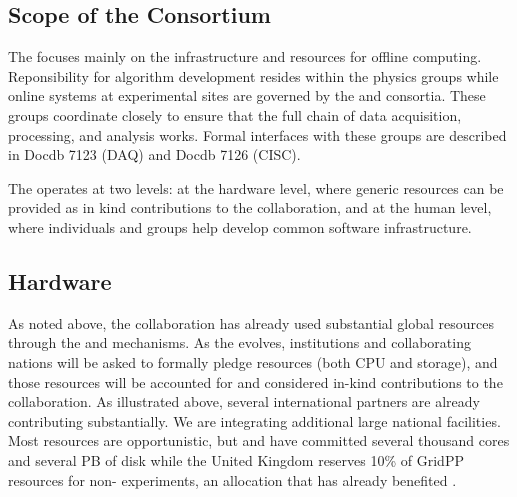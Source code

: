 \subsection{Scope of the Consortium}
The  focuses mainly on the infrastructure and resources for offline computing.  Reponsibility for algorithm development resides within the physics groups while online systems at experimental sites are governed by the  and  consortia. These groups coordinate closely to ensure that the full chain of data acquisition, processing, and analysis works. Formal interfaces with these groups are described in Docdb 7123 (DAQ)\cite{bib:docdb7123} and Docdb 7126 (CISC)\cite{bib:docdb7126}.

The  operates at two levels: at the hardware level, where generic resources can be provided as in kind contributions to the collaboration, and at the human level, where individuals and groups help develop common software infrastructure. 

\subsection{Hardware}
As noted above, the collaboration has already used substantial global resources through the  and  mechanisms. As the  evolves, institutions and collaborating nations will be asked to formally pledge resources (both CPU and storage), and those resources will be accounted for and considered in-kind contributions to the collaboration.
As illustrated above, several international partners are already contributing substantially. We are integrating additional large national facilities. Most resources are opportunistic, but  and  have committed several thousand cores and several PB of disk while the United Kingdom reserves 10\% of GridPP resources for non- experiments, an allocation that has already benefited .


